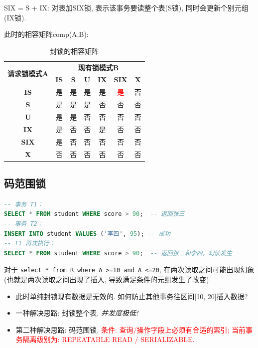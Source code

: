 SIX = S + IX: 对表加SIX锁, 表示该事务要读整个表(S锁), 同时会更新个别元组(IX锁).

此时的相容矩阵comp(A,B):
\begin{table}[H]
    \centering
    \begin{tabular}{|c|c|c|c|c|c|c|}
        \hline
        \multirow{2}{*}{\textbf{请求锁模式A}} & \multicolumn{6}{c|}{\textbf{现有锁模式B}} \\ \cline{2-7}
         & \textbf{IS} & \textbf{S} & \textbf{U} & \textbf{IX} & \textbf{SIX} & \textbf{X} \\ \hline
        \textbf{IS}  & 是 & 是 & 是 & 是 & \textcolor{red}{是} & 否 \\ \hline
        \textbf{S}   & 是 & 是 & 是 & 否 & 否 & 否 \\ \hline
        \textbf{U}   & 是 & 是 & 否 & 否 & 否 & 否 \\ \hline
        \textbf{IX}  & 是 & 否 & 否 & 是 & 否 & 否 \\ \hline
        \textbf{SIX} & 是 & 否 & 否 & 否 & 否 & 否 \\ \hline
        \textbf{X}   & 否 & 否 & 否 & 否 & 否 & 否 \\ \hline
    \end{tabular}
    \caption{封锁的相容矩阵}
\end{table}

\subsection{码范围锁}

\begin{lstlisting}[language=SQL, caption={幻象例子}]
-- 事务 T1：
SELECT * FROM student WHERE score > 90;  -- 返回张三
-- 事务 T2：
INSERT INTO student VALUES ('李四', 95); -- 成功
-- T1 再次执行：
SELECT * FROM student WHERE score > 90;  -- 返回张三和李四，幻读发生
\end{lstlisting}

对于 \verb|select * from R where A >=10 and A <=20|, 在两次读取之间可能出现幻象(也就是两次读取之间出现了插入, 导致满足条件的元组发生了改变).
\begin{itemize}
  \item 此时单纯封锁现有数据是无效的. 如何防止其他事务往区间[10, 20]插入数据?
  \item 一种解决思路: 封锁整个表. \textit{并发度极低!}
  \item 第二种解决思路: 码范围锁. \textcolor{red}{条件: 查询/操作字段上必须有合适的索引; 当前事务隔离级别为: REPEATABLE READ / SERIALIZABLE.}
\end{itemize}

